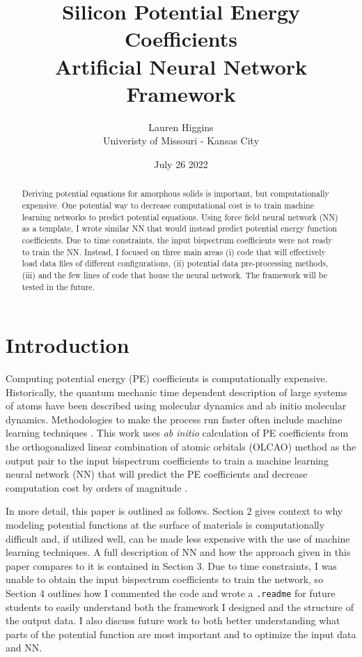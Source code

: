 \documentclass{article}
\title{Silicon Potential Energy Coefficients \\ Artificial Neural Network Framework}
\author{Lauren Higgins \\ Univeristy of Missouri - Kansas City}
\date{July 26 2022}
\begin{document}
\maketitle
\begin{abstract}
    Deriving potential equations for amorphous solids is important, but computationally 
    expensive. One potential way to decrease computational cost is to train machine learning 
    networks to predict potential equations. Using \citep{Yanxon2020} force field neural 
    network (NN) as a template, I wrote similar NN that would instead predict 
    potential energy function coefficients. Due to time constraints, the input bispectrum 
    coefficients were not ready to train the NN. Instead, I focused on three main areas (i) 
    code that will effectively load data files of different configurations, (ii) potential data
    pre-processing methods, (iii) and the few lines of code that house the neural network. The 
    framework will be tested in the future.
\end{abstract}

\section{Introduction}

Computing potential energy (PE) coefficients is computationally expensive. Historically, the 
quantum mechanic time dependent description of large systems of atoms have been described using
molecular dynamics and ab initio molecular dynamics. 
Methodologies to make the process run faster often include machine learning techniques 
\citep{Yanxon2020}. This work uses \textit{ab initio} calculation of PE coefficients from the 
orthogonalized linear combination of atomic orbitals (OLCAO) method as the output pair to the 
input bispectrum coefficients to train a machine learning neural network (NN) that will predict
the PE coefficients and decrease computation cost by orders of magnitude \cite{Yanxon2020}.   

In more detail, this paper is outlined as follows. Section 2 gives context to why modeling 
potential functions at the surface of materials is computationally difficult and, if utilized 
well, can be made less expensive with the use of machine learning techniques. A full 
description of \cite{Yanxon2020} NN and how the approach given in this paper compares to it is 
contained in Section 3. Due 
to time constraints, I was unable to obtain the input bispectrum coefficients to train the 
network, so Section 4 outlines how I commented the code and wrote a \texttt{.readme} 
for future students to easily understand both the framework I designed and the structure of the
output data. I also discuss future work to both better understanding what parts of the 
potential function are most important and to optimize the input data and NN.
\end{document}
